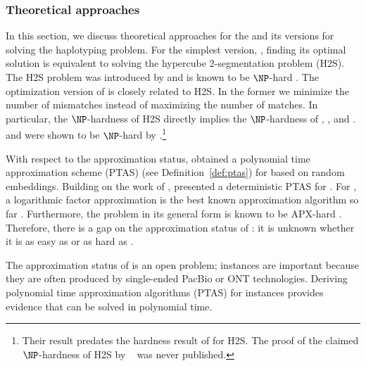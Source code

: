 \subsubsection{Theoretical approaches}
In this section, we discuss theoretical approaches for the \MEC and its versions for solving the haplotyping problem.
For the simplest version, \BMEC, finding its optimal solution is equivalent to solving the hypercube 2-segmentation problem (H2S).
The H2S problem was introduced by \cite{KPR98_segmentation,KPR04_segmentation} and is known to be $\NP$-hard \citep{Fei14_np,KPR04_segmentation}.
The optimization version of \BMEC  is closely related to H2S. In the former we minimize the number of mismatches instead of maximizing the number of matches.
In particular, the $\NP$-hardness of H2S directly implies the $\NP$-hardness of \BMEC, \GMEC, and \MEC.
\GMEC and \MEC were shown to be $\NP$-hard by \cite{Cilibrasi2007}.\footnote{Their result predates the hardness result of \cite{Fei14_np} for H2S. 
The proof of the claimed $\NP$-hardness of H2S by ~\cite{KPR98_segmentation} was never published.}

With respect to the approximation status, \cite{OR02_polynomial} obtained a polynomial time approximation scheme (PTAS) (see Definition~\ref{def:ptas}) for \BMEC based on random embeddings.
Building on the work of \cite{LMW02_finding}, \cite{JXL04_k} presented a deterministic PTAS for \BMEC.
For \GMEC, a logarithmic factor approximation is the best known approximation algorithm so far \citep{BDK+16_minimum}.
Furthermore, the \MEC problem in its general form is known to be APX-hard \citep{Cilibrasi2007}. 
Therefore, there is a gap on the approximation status of \GMEC: it is unknown whether it is as easy as \BMEC or as hard as \MEC.


\begin{gaps}
 The approximation status of \GMEC is an open problem; \GMEC instances are important  because they are often produced by single-ended PacBio or ONT technologies.
 Deriving polynomial time approximation algorithms (PTAS) for \GMEC instances provides evidence that \GMEC can be solved in polynomial time.
 \label{gap:gap1}
\end{gaps}

